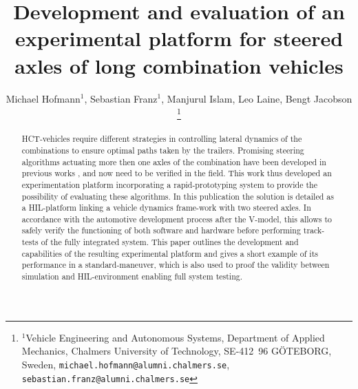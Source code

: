 \documentclass[letterpaper, 10pt, conference]{IEEEconf}      %
\title{\LARGE \bf
Development and evaluation of an experimental platform for steered axles of long combination vehicles}
\author{Michael Hofmann$^{1}$, Sebastian Franz$^{1}$, Manjurul Islam, Leo Laine, Bengt Jacobson%
	\thanks{$^{1}$Vehicle Engineering and Autonomous Systems, Department of Applied Mechanics, Chalmers University of Technology, SE-412~96 G\"OTEBORG, Sweden,
		{\tt\small michael.hofmann@alumni.chalmers.se},
		{\tt\small sebastian.franz@alumni.chalmers.se}}%
}
\begin{document}
\maketitle
\thispagestyle{empty}
\pagestyle{empty}


\begin{abstract}

\gls{HCT}-vehicles require different strategies in controlling lateral dynamics of the combinations to ensure optimal paths taken by the trailers. Promising steering algorithms actuating more then one axles of the combination have been developed in previous works \cite{islam2015improve},\cite{islam2015inverse} and now need to be verified in the field. This work thus developed an experimentation platform incorporating a rapid-prototyping system to provide the possibility of evaluating these algorithms. In this publication the solution is detailed as a \gls{HIL}-platform linking a vehicle dynamics frame-work with two steered axles. In accordance with the automotive development process after the V-model\cite{automotive_software_engineering}, this allows to safely verify the functioning of both software and hardware before performing track-tests of the fully integrated system. This paper outlines the development and capabilities of the resulting experimental platform and gives a short example of its performance in a standard-maneuver, which is also used to proof the validity between simulation and \gls{HIL}-environment enabling full system testing.

\end{abstract}








%



%





\addtolength{\textheight}{-12cm}   %
\end{document}
